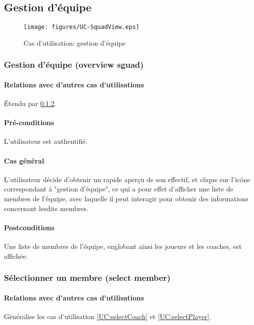 

\subsection{Gestion d'équipe}

\begin{figure}[h]
  \centering
  \texttt{[image: figures/UC-SquadView.eps]}
  \caption{\label{fig:UC:SquadView} Cas d'utilisation: gestion d'équipe}
\end{figure}

\subsubsection{Gestion d'équipe (overview sguad)}
\label{UC:squadView}
\paragraph{Relations avec d'autres \gls{cas d'utilisation}s}
Étendu par \ref{UC:selectMember}.
\paragraph{Pré-conditions}
\begin{list}{}{\leftmargin=1.5em}
\item{L'\gls{utilisateur} est authentifié.}
\end{list}
\paragraph{Cas général}
L'utilisateur décide d'obtenir un rapide aperçu de son effectif, et clique sur l'icône correspondant à "gestion d'équipe", ce qui a pour effet d'afficher une liste de membres de l'équipe, avec laquelle il peut interagir pour obtenir des informations concernant lesdits membres.
\paragraph{Postconditions} Une liste de membres de l'équipe, englobant ainsi 
les joueurs et les coaches, est affichée.

\subsubsection{Sélectionner un membre (select member)}
\label{UC:selectMember}
\paragraph{Relations avec d'autres cas d'utilisations}
Généralise les cas d'utilisation \ref{UC:selectCoach} et \ref{UC:selectPlayer}.
